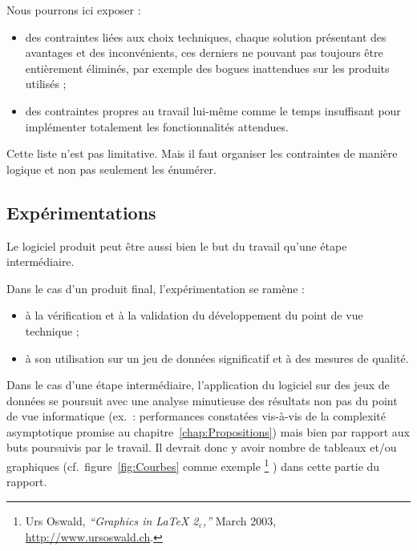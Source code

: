 \documentclass[11pt, french]{report-rd-info}
\begin{document}
Nous pourrons ici exposer :
\begin{itemize}
	\item des contraintes liées aux choix techniques, chaque solution présentant des avantages et des inconvénients, ces derniers ne pouvant pas toujours être entièrement éliminés, par exemple des bogues inattendues sur les produits utilisés ;
	\item des contraintes propres au travail lui-même comme le temps insuffisant pour implémenter totalement les fonctionnalités attendues.
\end{itemize}

Cette liste n'est pas limitative. Mais il faut organiser les contraintes de manière logique et non pas seulement les énumérer.

\subsection{Expérimentations}

Le logiciel produit peut être aussi bien le but du travail qu'une étape intermédiaire.

\bigskip

Dans le cas d'un produit final, l'expérimentation se ramène :
\begin{itemize}
	\item à la vérification et à la validation du développement du point de vue technique ;
	\item à son utilisation sur un jeu de données significatif et à des mesures de qualité.
\end{itemize}

\bigskip

Dans le cas d'une étape intermédiaire, l'application du logiciel sur des jeux de données se poursuit avec une analyse minutieuse des résultats non pas du point de vue informatique (ex.\ : performances constatées vis-à-vis de la complexité asymptotique promise au chapitre~\ref{chap:Propositions}) mais bien par rapport aux buts poursuivis par le travail. Il devrait donc y avoir nombre de tableaux et/ou graphiques (cf.\ figure~\ref{fig:Courbes} comme exemple%
\footnote{Urs Oswald, \emph{``Graphics in LaTeX 2$_\varepsilon$,''} March 2003, \url{http://www.ursoswald.ch}.}%
) dans cette partie du rapport.
\end{document}
